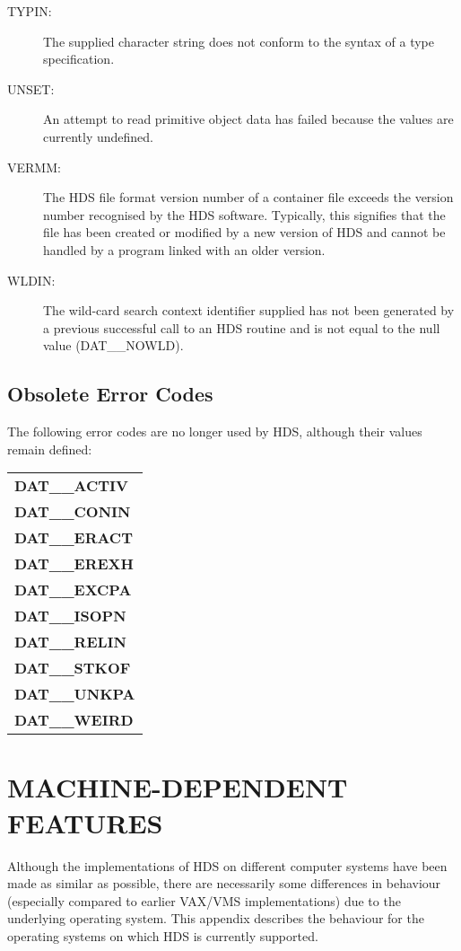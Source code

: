 \documentclass[11pt]{article}
\newcommand{\htmlref}[2]{#1}
\newcommand{\xlabel}[1]{}
\begin{document}
\begin{description}
\item [TYPIN:]
The supplied character string does not conform to the syntax of a
\htmlref{type}{sect:type} specification.

\item [UNSET:]
An attempt to read primitive object data has failed because the values are
currently undefined.

\item [VERMM:]
The HDS file format version number of a container file exceeds the version
number recognised by the HDS software. Typically, this signifies that the file
has been created or modified by a new version of HDS and cannot be handled by a
program linked with an older version.

\item [WLDIN:]
The wild-card search context identifier supplied has not been generated by a
previous successful call to an HDS routine and is not equal to the null value
(DAT\_\_NOWLD).

\end{description}

\subsection{Obsolete Error Codes}
The following error codes are no longer used by HDS, although their values
remain defined:

\begin{center}
\begin{tabular}{l}
{\bf DAT\_\_ACTIV}\\
{\bf DAT\_\_CONIN}\\
{\bf DAT\_\_ERACT}\\
{\bf DAT\_\_EREXH}\\
{\bf DAT\_\_EXCPA}\\
{\bf DAT\_\_ISOPN}\\
{\bf DAT\_\_RELIN}\\
{\bf DAT\_\_STKOF}\\
{\bf DAT\_\_UNKPA}\\
{\bf DAT\_\_WEIRD}
\end{tabular}
\end{center}

\newpage
\section{\xlabel{machine_dependencies}MACHINE-DEPENDENT FEATURES}

Although the implementations of HDS on different computer systems have
been made as similar as possible, there are necessarily some
differences in behaviour (especially compared to earlier VAX/VMS
implementations) due to the underlying operating system. This appendix
describes the behaviour for the operating systems on which HDS is
currently supported.
\end{document}
